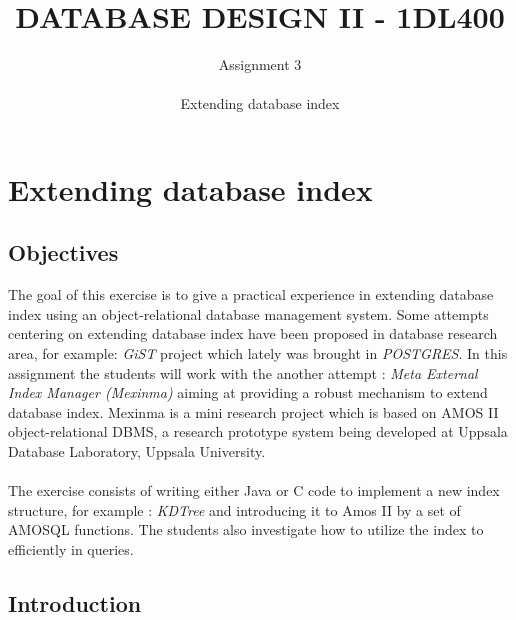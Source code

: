 \documentclass[12pt]{article}
\title{DATABASE DESIGN II - 1DL400}
\author{Assignment 3 \\ \\ Extending database index}
\date{}                                           %
\begin{document}
\maketitle


\section{Extending database index}

\subsection{Objectives}

The goal of this exercise is to give a practical experience in extending database index using an object-relational database management system. Some attempts centering on extending database index have been proposed in database research area, for example: \emph{GiST} project which lately was brought in \emph{POSTGRES}. In this assignment the students will work with the another attempt : \emph{Meta External Index Manager (Mexinma)} aiming at providing a robust mechanism to extend database index. Mexinma is a mini research project which is based on AMOS II object-relational DBMS, a  research prototype system being developed at Uppsala Database Laboratory, Uppsala University. \\\\
The exercise consists of writing either Java or C code to implement a new index structure, for example : \emph{KDTree} and introducing it to Amos II by a set of AMOSQL functions. The students also investigate how to utilize the index to efficiently in queries.

\subsection{Introduction}
\end{document}
